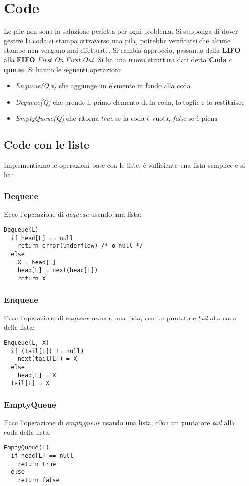 \documentclass[a4paper,12pt,oneside,tikz]{book}
\begin{document}
\section{Code}
Le pile non sono la soluzione perfetta per ogni problema. Si supponga di dover gestire la coda si stampa attraverso una pila, potrebbe verificarsi che alcune stampe non vengano mai effettuate. Si cambia approccio, passando dalla \textbf{LIFO} alla \textbf{FIFO} \textit{First On First Out}. Si ha una nuova struttura dati detta \textbf{Coda} o \textbf{queue}. Si hanno le seguenti operazioni:
\begin{itemize}
\item \textit{Enqueue(Q,x)} che aggiunge un elemento in fondo alla coda
\item \textit{Dequeue(Q)} che prende il primo elemento della coda, lo toglie e lo restituisce
\item \textit{EmptyQueue(Q)} che ritorna \textit{true} se la coda è vuota, \textit{false} se è piena
\end{itemize}
\subsection{Code con le liste}
Implementiamo le operazioni base con le liste, è sufficiente una lista semplice e si ha:
\subsubsection{Dequeue}
Ecco l'operazione di \textit{dequeue} usando una lista:
\begin{verbatim}
Dequeue(L)
  if head[L] == null
    return error(underflow) /* o null */
  else
    X = head[L]
    head[L] = next(head[L])
    return X
\end{verbatim}
\subsubsection{Enqueue}
Ecco l'operazione di \textit{enqueue} usando una lista, con un puntatore \textit{tail} alla coda della lista:
\begin{verbatim}
Enqueue(L, X)
  if (tail[L]) != null)
    next(tail[L]) = X
  else
    head[L] = X
  tail[L] = X
\end{verbatim}
\subsubsection{EmptyQueue}
Ecco l'operazione di \textit{emptyqueue} usando una lista, c0on un puntatore \textit{tail} alla coda della lista:
\begin{verbatim}
EmptyQueue(L)
  if head[L] == null
    return true
  else
    return false
\end{verbatim}
\end{document}
